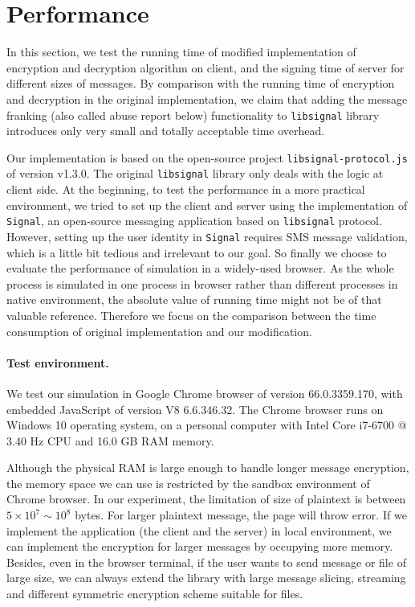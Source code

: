 
\section{Performance}
In this section, we test the running time of modified implementation of encryption and decryption algorithm on client,
and the signing time of server for different sizes of messages.
By comparison with the running time of encryption and decryption in the original implementation,
we claim that adding the message franking (also called abuse report below) functionality to \texttt{libsignal} library introduces only very small and totally acceptable time overhead. 


Our implementation is based on the open-source project \texttt{libsignal-protocol.js} of version v1.3.0.
The original \texttt{libsignal} library only deals with the logic at client side.
At the beginning, to test the performance in a more practical environment,
we tried to set up the client and server using the implementation of \texttt{Signal}, an open-source messaging application based on \texttt{libsignal} protocol.
However, setting up the user identity in \texttt{Signal} requires SMS message validation,
which is a little bit tedious and irrelevant to our goal.
So finally we choose to evaluate the performance of simulation in a widely-used browser.
As the whole process 
is simulated in one process in browser rather than different processes in native environment,
the absolute value of running time might not be of that valuable reference.
Therefore we focus on the comparison between the time consumption of original implementation and our modification.



\paragraph{Test environment.}
We test our simulation in Google Chrome browser of version 66.0.3359.170,
with embedded JavaScript of version V8 6.6.346.32.
The Chrome browser runs on Windows 10 operating system,
on a personal computer with Intel Core i7-6700 @ 3.40 Hz CPU and 16.0 GB RAM memory.


Although the physical RAM is large enough to handle longer message encryption,
the memory space we can use is restricted by the sandbox environment of Chrome browser.
In our experiment, the limitation of size of plaintext is between $5 \times 10^7 \sim 10^8$ bytes.
For larger plaintext message, the page will throw error.
If we implement the application (the client and the server) in local environment,
we can implement the encryption for larger messages by occupying more memory.
Besides, even in the browser terminal,
if the user wants to send message or file of large size,
we can always extend the library with large message slicing, streaming and different symmetric encryption scheme suitable for files.

